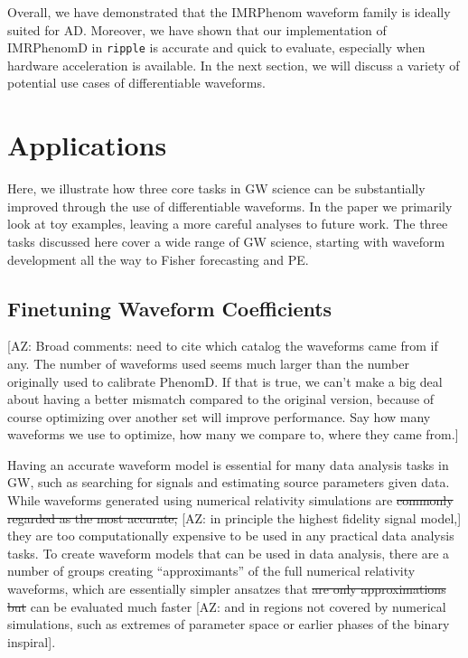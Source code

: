 \documentclass[twocolumn]{aastex631}
\newcommand{\ripple}{\texttt{ripple}\xspace}
\newcommand{\AZ}[1]{{\color{Burnt}[AZ: #1]}}
\begin{document}
Overall, we have demonstrated that the IMRPhenom waveform family is ideally suited for AD.
Moreover, we have shown that our implementation of IMRPhenomD in \ripple is accurate and quick to evaluate, especially when hardware acceleration is available.
In the next section, we will discuss a variety of potential use cases of differentiable waveforms.


\section{Applications}
\label{sec:applications}

Here, we illustrate how three core tasks in GW science can be substantially improved through the use of differentiable waveforms.
In the paper we primarily look at toy examples, leaving a more careful analyses to future work. 
The three tasks discussed here cover a wide range of GW science, starting with waveform development all the way to Fisher forecasting and PE.

\subsection{Finetuning Waveform Coefficients}
\label{subsec:coeffs}

\AZ{Broad comments: need to cite which catalog the waveforms came from if any.
The number of waveforms used seems much larger than the number originally used
to calibrate PhenomD. 
If that is true, we can't make a big deal about having a better mismatch compared to
the original version, because of course optimizing over another set will improve 
performance.
Say how many waveforms we use to optimize, how many we compare to, where they came
from.}

Having an accurate waveform model is essential for many data analysis tasks in
GW, such as searching for signals and estimating source parameters given data.
While waveforms generated using numerical relativity simulations are \sout{commonly
regarded as the most accurate,} 
\AZ{in principle the highest fidelity signal model,}
they are too computationally expensive to be used
in any practical data analysis tasks. To create waveform models that can be used
in data analysis, there are a number of groups creating ``approximants'' of the
full numerical relativity waveforms, which are essentially simpler ansatzes that
\sout{are only approximations but} can be evaluated much faster \AZ{and in regions not
covered by numerical simulations, such as extremes of parameter space or earlier 
phases of the binary inspiral}. 
\end{document}

